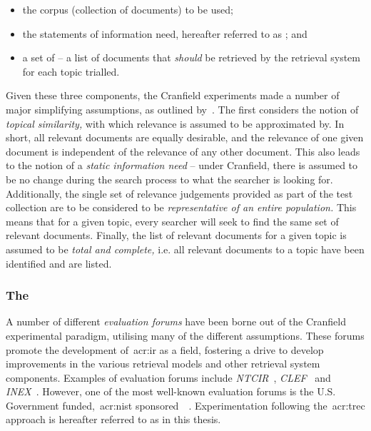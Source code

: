\begin{itemize}
    \item{the corpus (collection of documents) to be used;}
    \item{the statements of information need, hereafter referred to as ; and}
    \item{a set of  -- a list of documents that \emph{should} be retrieved by the retrieval system for each topic trialled.}
\end{itemize}

Given these three components, the Cranfield experiments made a number of major simplifying assumptions, as outlined by~\cite{voorhees2001iir_philosophy}. The first considers the notion of \emph{topical similarity,} with which relevance is assumed to be approximated by. In short, all relevant documents are equally desirable, and the relevance of one given document is independent of the relevance of any other document. This also leads to the notion of a \emph{static information need} -- under Cranfield, there is assumed to be no change during the search process to what the searcher is looking for. Additionally, the single set of relevance judgements provided as part of the test collection are to be considered to be \emph{representative of an entire population.} This means that for a given topic, every searcher will seek to find the same set of relevant documents. Finally, the list of relevant documents for a given topic is assumed to be \emph{total and complete,} i.e. all relevant documents to a topic have been identified and are listed.

\subsubsection{The~}\label{sec:ir_background:paradigms:trec}
A number of different \emph{evaluation forums} have been borne out of the Cranfield experimental paradigm, utilising many of the different assumptions. These forums promote the development of~\gls{acr:ir} as a field, fostering a drive to develop improvements in the various retrieval models and other retrieval system components. Examples of evaluation forums include \emph{NTCIR}~\citep{kando1999ntcir}, \emph{CLEF}~\citep{braschler2001clef} and \emph{INEX}~\citep{fuhr2006advances}. However, one of the most well-known evaluation forums is the U.S. Government funded,~\gls{acr:nist} sponsored~~\citep{harman1993trec1}. Experimentation following the~\gls{acr:trec} approach is hereafter referred to as  in this thesis.

